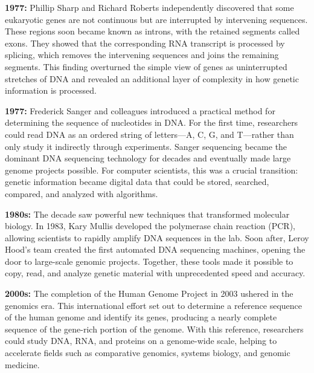 \medskip\noindent\textbf{1977:} Phillip Sharp and Richard Roberts independently discovered that some eukaryotic genes are not continuous but are interrupted by intervening sequences. These regions soon became known as introns, with the retained segments called exons. They showed that the corresponding RNA transcript is processed by splicing, which removes the intervening sequences and joins the remaining segments. This finding overturned the simple view of genes as uninterrupted stretches of DNA and revealed an additional layer of complexity in how genetic information is processed.

\medskip\noindent\textbf{1977:} Frederick Sanger and colleagues introduced a practical method for determining the sequence of nucleotides in DNA.
%
%
For the first time, researchers could read DNA as an ordered string of letters---A, C, G, and T---rather than only study it indirectly through experiments. Sanger sequencing became the dominant DNA sequencing technology for decades and eventually made large genome projects possible. For computer scientists, this was a crucial transition: genetic information became digital data that could be stored, searched, compared, and analyzed with algorithms.


\medskip\noindent\textbf{1980s:} The decade saw powerful new techniques that transformed molecular biology.
%
%
In 1983, Kary Mullis developed the polymerase chain reaction (PCR), allowing scientists to rapidly amplify DNA sequences in the lab. Soon after, Leroy Hood's team created the first automated DNA sequencing machines, opening the door to large-scale genomic projects. Together, these tools made it possible to copy, read, and analyze genetic material with unprecedented speed and accuracy.

\medskip\noindent\textbf{2000s:} The completion of the Human Genome Project in 2003 ushered in the genomics era. This international effort set out to determine a reference sequence of the human genome and identify its genes, producing a nearly complete sequence of the gene-rich portion of the genome. With this reference, researchers could study DNA, RNA, and proteins on a genome-wide scale, helping to accelerate fields such as comparative genomics, systems biology, and genomic medicine.

